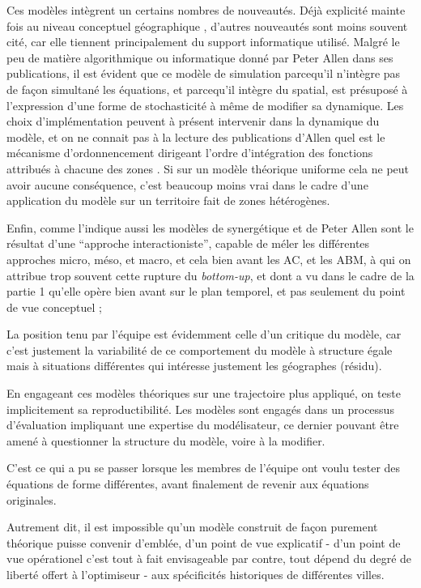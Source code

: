 Ces modèles intègrent un certains nombres de nouveautés. Déjà explicité mainte fois au niveau conceptuel géographique \autocites{Pumain1989, Sanders1992}, d'autres nouveautés sont  moins souvent cité, car elle tiennent principalement du support informatique utilisé. Malgré le peu de matière algorithmique ou informatique donné par Peter Allen dans ses publications, il est évident que ce modèle de simulation parcequ'il n'intègre pas de façon simultané les équations, et parcequ'il intègre du spatial, est présuposé à l'expression d'une forme de stochasticité à même de modifier sa dynamique. Les choix d'implémentation peuvent à présent intervenir dans la dynamique du modèle, et on ne connait pas à la lecture des publications d'Allen quel est le mécanisme d'ordonnencement dirigeant l'ordre d'intégration des fonctions attribués à chacune des zones \autocite[231-233]{Varenne2014}. Si sur un modèle théorique uniforme cela ne peut avoir aucune conséquence, c'est beaucoup moins vrai dans le cadre d'une application du modèle sur un territoire fait de zones hétérogènes.

Enfin, comme l'indique aussi \textcites[850]{Sanders2013}{Pumain2013} les modèles de synergétique et de Peter Allen sont le résultat d'une \enquote{approche interactioniste}, capable de méler les différentes approches micro, méso, et macro, et cela bien avant les AC, et les ABM, à qui on attribue trop souvent cette rupture du \textit{bottom-up}, et dont a vu dans le cadre de la partie 1 qu'elle opère bien avant sur le plan temporel, et pas seulement du point de vue conceptuel \autocites{Orcutt1957,Hagerstrand1967};

La position tenu par l'équipe est évidemment celle d'un critique du modèle, car c'est justement la variabilité de ce comportement du modèle à structure égale mais à situations différentes qui intéresse justement les géographes (résidu).

En engageant ces modèles théoriques sur une trajectoire plus appliqué, on teste implicitement sa reproductibilité. Les modèles sont engagés dans un processus d'évaluation impliquant une expertise du modélisateur, ce dernier pouvant être amené à questionner la structure du modèle, voire à la modifier.

C'est ce qui a pu se passer lorsque les membres de l'équipe ont voulu tester des équations de forme différentes, avant finalement de revenir aux équations originales.

Autrement dit, il est impossible qu'un modèle construit de façon purement théorique puisse convenir d'emblée, d'un point de vue explicatif - d'un point de vue opérationel c'est tout à fait envisageable par contre, tout dépend du degré de liberté offert à l'optimiseur - aux spécificités historiques de différentes villes.

